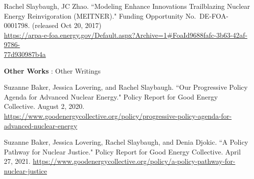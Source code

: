 \begin{bibsection}
\item Rachel Slaybaugh, JC Zhao. ``Modeling Enhance Innovations Trailblazing Nuclear Energy Reinvigoration (MEITNER)." Funding Opportunity No.\ DE-FOA-0001798. (released Oct 20, 2017)\\
\url{https://arpa-e-foa.energy.gov/Default.aspx?Archive=1#FoaId9688fafc-3b63-42af-9786-}\\ \url{77d930987b4a}

\item \textbf{Other Works} : Other Writings
\item Suzanne Baker, Jessica Lovering, and Rachel Slaybaugh. ``Our Progressive Policy Agenda for Advanced Nuclear Energy." Policy Report for Good Energy Collective. August 2, 2020. \url{https://www.goodenergycollective.org/policy/progressive-policy-agenda-for-advanced-nuclear-energy}

\item Suzanne Baker, Jessica Lovering, Rachel Slaybaugh, and Denia Djokic. ``A Policy Pathway for Nuclear Justice." Policy Report for Good Energy Collective. April 27, 2021. \url{https://www.goodenergycollective.org/policy/a-policy-pathway-for-nuclear-justice}


\end{bibsection}


